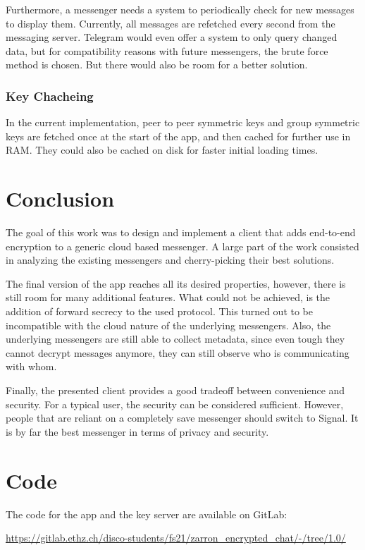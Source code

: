 \documentclass[a4paper, oneside]{discothesis}
\begin{document}
Furthermore, a messenger needs a system to periodically check for new messages to display them. Currently, all messages are refetched every second from the messaging server. Telegram would even offer a system to only query changed data, but for compatibility reasons with future messengers, the brute force method is chosen. But there would also be room for a better solution.

\subsection{Key Chacheing}

In the current implementation, peer to peer symmetric keys and group symmetric keys are fetched once at the start of the app, and then cached for further use in RAM. They could also be cached on disk for faster initial loading times.

\chapter{Conclusion}

The goal of this work was to design and implement a client that adds end-to-end encryption to a generic cloud based messenger. A large part of the work consisted in analyzing the existing messengers and cherry-picking their best solutions.

The final version of the app reaches all its desired properties, however, there is still room for many additional features. What could not be achieved, is the addition of forward secrecy to the used protocol. This turned out to be incompatible with the cloud nature of the underlying messengers. Also, the underlying messengers are still able to collect metadata, since even tough they cannot decrypt messages anymore, they can still observe who is communicating with whom. 

Finally, the presented client provides a good tradeoff between convenience and security. For a typical user, the security can be considered sufficient. However, people that are reliant on a completely save messenger should switch to Signal. It is by far the best messenger in terms of privacy and security. 




\appendix
\chapter{Code}

The code for the app and the key server are available on GitLab:

\url{https://gitlab.ethz.ch/disco-students/fs21/zarron_encrypted_chat/-/tree/1.0/}
\end{document}
